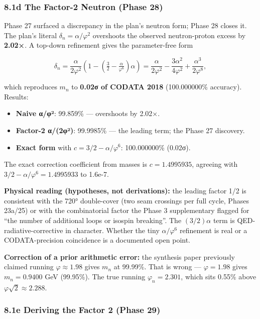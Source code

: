 \documentclass[
]{article}
\providecommand{\tightlist}{%
  \setlength{\itemsep}{0pt}\setlength{\parskip}{0pt}}
\begin{document}
\subsubsection{8.1d The Factor-2 Neutron (Phase
28)}\label{d-the-factor-2-neutron-phase-28}

Phase 27 surfaced a discrepancy in the plan's neutron form; Phase 28
closes it. The plan's literal \(\delta_n = \alpha/\varphi^2\) overshoots
the observed neutron-proton excess by \textbf{2.02×}. A top-down
refinement gives the parameter-free form

\[\delta_n = \frac{\alpha}{2\varphi^2}\left(1 - \left(\tfrac{3}{2} - \tfrac{\alpha}{\varphi^6}\right)\alpha\right)
         = \frac{\alpha}{2\varphi^2} - \frac{3\alpha^2}{4\varphi^2} + \frac{\alpha^3}{2\varphi^8},\]

which reproduces \(m_n\) to \textbf{0.02σ of CODATA 2018} (100.000000\%
accuracy). Results:

\begin{itemize}
\tightlist
\item
  \textbf{Naive α/φ²}: 99.859\% --- overshoots by 2.02×.
\item
  \textbf{Factor-2 α/(2φ²)}: 99.9985\% --- the leading term; the Phase
  27 discovery.
\item
  \textbf{Exact form} with \(c = 3/2 - \alpha/\varphi^6\): 100.000000\%
  (0.02σ).
\end{itemize}

The exact correction coefficient from masses is \(c = 1.4995935\),
agreeing with \(3/2 - \alpha/\varphi^6 = 1.4995933\) to 1.6e-7.

\textbf{Physical reading (hypotheses, not derivations):} the leading
factor 1/2 is consistent with the 720° double-cover (two seam crossings
per full cycle, Phases 23a/25) or with the combinatorial factor the
Phase 3 supplementary flagged for ``the number of additional loops or
isospin breaking''. The \((3/2)\alpha\) term is QED-radiative-corrective
in character. Whether the tiny \(\alpha/\varphi^6\) refinement is real
or a CODATA-precision coincidence is a documented open point.

\textbf{Correction of a prior arithmetic error:} the synthesis paper
previously claimed running \(\varphi \approx 1.98\) gives \(m_n\) at
99.99\%. That is wrong --- \(\varphi = 1.98\) gives \(m_n = 0.9400\) GeV
(99.95\%). The true running \(\varphi_n = 2.301\), which sits 0.55\%
above \(\varphi\sqrt{2} \approx 2.288\).

\subsubsection{8.1e Deriving the Factor 2 (Phase
29)}\label{e-deriving-the-factor-2-phase-29}
\end{document}
